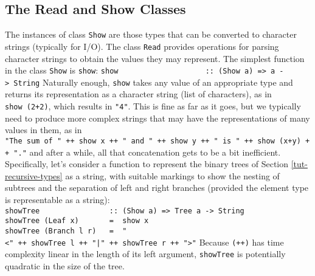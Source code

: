 \subsection{The Read and Show Classes}
\label{tut-text-class}

The instances of class \mbox{\tt Show} are those types that can be converted
to character strings (typically for I/O).  The class \mbox{\tt Read} 
provides operations for parsing character strings to obtain the values
they may represent.  The simplest function in the class \mbox{\tt Show} is
\mbox{\tt show}: 
\bprog
\mbox{\tt show\ \ \ \ \ \ \ \ \ \ \ \ \ \ \ \ \ \ \ \ ::\ (Show\ a)\ =>\ a\ ->\ String}
\eprog
Naturally enough, \mbox{\tt show} takes any value of an appropriate type and
returns its representation as a character string (list of characters),
as in \mbox{\tt show\ (2+2)}, which results in \mbox{\tt "4"}.  This is fine as far as
it goes, but we typically need to produce more complex strings
that may have the representations of many values in them, as in
\bprog
\mbox{\tt "The\ sum\ of\ "\ ++\ show\ x\ ++\ "\ and\ "\ ++\ show\ y\ ++\ "\ is\ "\ ++\ show\ (x+y)\ ++\ "."}
\eprog
and after a while, all that concatenation gets to be a bit
inefficient.  Specifically, let's consider a function to represent
the binary trees of Section \ref{tut-recursive-types} as a string,
with suitable markings to show the nesting of subtrees and the
separation of left and right branches (provided the element type is
representable as a string):
\bprog
\mbox{\tt showTree\ \ \ \ \ \ \ \ \ \ \ \ \ \ \ \ ::\ (Show\ a)\ =>\ Tree\ a\ ->\ String}\\
\mbox{\tt showTree\ (Leaf\ x)\ \ \ \ \ \ \ =\ \ show\ x}\\
\mbox{\tt showTree\ (Branch\ l\ r)\ \ \ =\ \ "<"\ ++\ showTree\ l\ ++\ "|"\ ++\ showTree\ r\ ++\ ">"}
\eprog
Because \mbox{\tt (++)} has time complexity linear in the length of its
left argument, \mbox{\tt showTree} is potentially quadratic in the size of the
tree. 

